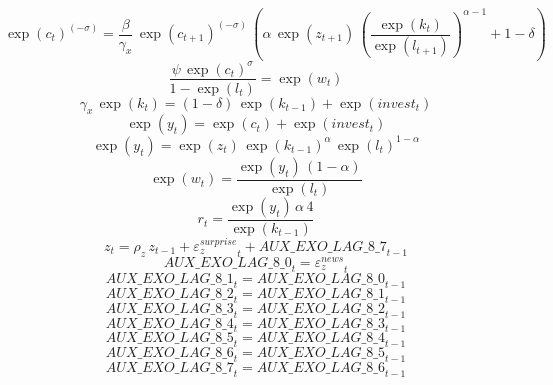 \begin{dmath}
\exp\left({c}_{t}\right)^{\left(-{\sigma}\right)}=\frac{{\beta}}{{\gamma_x}}\, \exp\left({c}_{t+1}\right)^{\left(-{\sigma}\right)}\, \left({\alpha}\, \exp\left({z}_{t+1}\right)\, \left(\frac{\exp\left({k}_{t}\right)}{\exp\left({l}_{t+1}\right)}\right)^{{\alpha}-1}+1-{\delta}\right)
\end{dmath}
\begin{dmath}
\frac{{\psi}\, \exp\left({c}_{t}\right)^{{\sigma}}}{1-\exp\left({l}_{t}\right)}=\exp\left({w}_{t}\right)
\end{dmath}
\begin{dmath}
{\gamma_x}\, \exp\left({k}_{t}\right)=\left(1-{\delta}\right)\, \exp\left({k}_{t-1}\right)+\exp\left({invest}_{t}\right)
\end{dmath}
\begin{dmath}
\exp\left({y}_{t}\right)=\exp\left({c}_{t}\right)+\exp\left({invest}_{t}\right)
\end{dmath}
\begin{dmath}
\exp\left({y}_{t}\right)=\exp\left({z}_{t}\right)\, \exp\left({k}_{t-1}\right)^{{\alpha}}\, \exp\left({l}_{t}\right)^{1-{\alpha}}
\end{dmath}
\begin{dmath}
\exp\left({w}_{t}\right)=\frac{\exp\left({y}_{t}\right)\, \left(1-{\alpha}\right)}{\exp\left({l}_{t}\right)}
\end{dmath}
\begin{dmath}
{r}_{t}=\frac{\exp\left({y}_{t}\right)\, {\alpha}\, 4}{\exp\left({k}_{t-1}\right)}
\end{dmath}
\begin{dmath}
{z}_{t}={\rho_z}\, {z}_{t-1}+{{\varepsilon_z^{surprise}}}_{t}+{AUX\_EXO\_LAG\_8\_7}_{t-1}
\end{dmath}
\begin{dmath}
{AUX\_EXO\_LAG\_8\_0}_{t}={{\varepsilon_z^{news}}}_{t}
\end{dmath}
\begin{dmath}
{AUX\_EXO\_LAG\_8\_1}_{t}={AUX\_EXO\_LAG\_8\_0}_{t-1}
\end{dmath}
\begin{dmath}
{AUX\_EXO\_LAG\_8\_2}_{t}={AUX\_EXO\_LAG\_8\_1}_{t-1}
\end{dmath}
\begin{dmath}
{AUX\_EXO\_LAG\_8\_3}_{t}={AUX\_EXO\_LAG\_8\_2}_{t-1}
\end{dmath}
\begin{dmath}
{AUX\_EXO\_LAG\_8\_4}_{t}={AUX\_EXO\_LAG\_8\_3}_{t-1}
\end{dmath}
\begin{dmath}
{AUX\_EXO\_LAG\_8\_5}_{t}={AUX\_EXO\_LAG\_8\_4}_{t-1}
\end{dmath}
\begin{dmath}
{AUX\_EXO\_LAG\_8\_6}_{t}={AUX\_EXO\_LAG\_8\_5}_{t-1}
\end{dmath}
\begin{dmath}
{AUX\_EXO\_LAG\_8\_7}_{t}={AUX\_EXO\_LAG\_8\_6}_{t-1}
\end{dmath}
